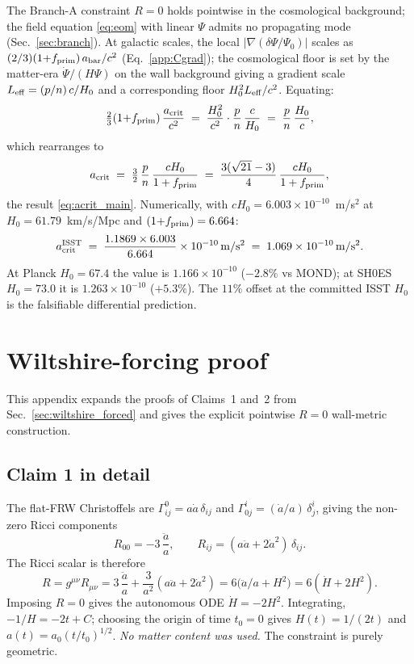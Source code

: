 \documentclass[aps,prd,twocolumn,nofootinbib,floatfix,superscriptaddress]{revtex4-2}
\begin{document}
The Branch-A constraint $R = 0$ holds pointwise in the cosmological
background; the field equation \eqref{eq:eom} with linear $\Psi$
admits no propagating mode (Sec.~\ref{sec:branch}). At galactic
scales, the local $|\nabla(\delta\Psi/\Psi_0)|$ scales as
$(2/3)(1{+}f_{\rm prim})\,a_{\rm bar}/c^2$ (Eq.~\ref{app:Cgrad});
the cosmological floor is set by the
matter-era $\dot\Psi/(H\Psi)$ on the wall background giving a
gradient scale $L_{\rm eff} = (p/n)\,c/H_0$ and a corresponding
floor $H_0^2 L_{\rm eff}/c^2$. Equating:
\begin{equation}
\tfrac{2}{3}(1{+}f_{\rm prim})\,\frac{a_{\rm crit}}{c^2}
\;=\;
\frac{H_0^2}{c^2} \cdot \frac{p}{n}\,\frac{c}{H_0}
\;=\; \frac{p}{n}\,\frac{H_0}{c},
\end{equation}
which rearranges to
\begin{equation}
a_{\rm crit} \;=\; \tfrac{3}{2}\,\frac{p}{n}\,
\frac{cH_0}{1+f_{\rm prim}}
\;=\; \frac{3(\sqrt{21}-3)}{4}\,\frac{cH_0}{1+f_{\rm prim}},
\end{equation}
the result \eqref{eq:acrit_main}. Numerically, with $cH_0 = 6.003
\times 10^{-10}$~m/s$^2$ at $H_0 = 61.79$~km/s/Mpc and
$(1{+}f_{\rm prim}) = 6.664$:
\begin{equation}
a_{\rm crit}^{\rm ISST} \;=\; \frac{1.1869 \times 6.003}{6.664}\times
10^{-10}\,{\rm m/s^2} \;=\; 1.069\times 10^{-10}\,{\rm m/s^2}.
\end{equation}
At Planck $H_0 = 67.4$ the value is $1.166\times 10^{-10}$ ($-2.8\%$
vs MOND); at SH0ES $H_0 = 73.0$ it is $1.263\times 10^{-10}$ ($+5.3\%$).
The $11\%$ offset at the committed ISST $H_0$ is the falsifiable
differential prediction.

\section{Wiltshire-forcing proof}
\label{app:wiltshire_forced}

This appendix expands the proofs of Claims~1 and~2 from
Sec.~\ref{sec:wiltshire_forced} and gives the explicit pointwise
$R = 0$ wall-metric construction.

\subsection{Claim 1 in detail}
\label{sec:claim1}

The flat-FRW Christoffels are $\Gamma^0_{ij} = a\dot a\,\delta_{ij}$
and $\Gamma^i_{0j} = (\dot a/a)\,\delta^i_j$, giving the non-zero
Ricci components
\begin{equation}
R_{00} = -3\,\frac{\ddot a}{a},
\qquad
R_{ij} = (a\ddot a + 2\dot a^2)\,\delta_{ij}.
\end{equation}
The Ricci scalar is therefore
\begin{equation}
R = g^{\mu\nu}R_{\mu\nu}
= 3\,\frac{\ddot a}{a} + \frac{3}{a^2}(a\ddot a + 2\dot a^2)
= 6\bigl(\ddot a/a + H^2\bigr) = 6(\dot H + 2H^2).
\end{equation}
Imposing $R = 0$ gives the autonomous ODE
$\dot H = -2H^2$. Integrating, $-1/H = -2t + C$; choosing the
origin of time $t_0 = 0$ gives $H(t) = 1/(2t)$ and
$a(t) = a_0(t/t_0)^{1/2}$. \emph{No matter content was used.} The
constraint is purely geometric.
\end{document}

